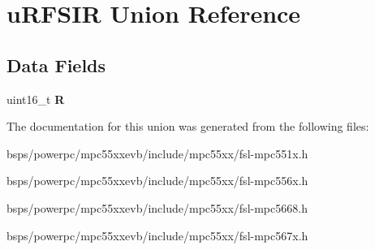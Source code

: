\hypertarget{unionuRFSIR}{}\section{u\+R\+F\+S\+IR Union Reference}
\label{unionuRFSIR}
\subsection*{Data Fields}
\begin{DoxyCompactItemize}
\item 
\mbox{\label{unionuRFSIR_a9af810821165fb55083817e7209de372}} 
uint16\+\_\+t {\bfseries R}
\end{DoxyCompactItemize}


The documentation for this union was generated from the following files\+:\begin{DoxyCompactItemize}
\item 
bsps/powerpc/mpc55xxevb/include/mpc55xx/fsl-\/mpc551x.\+h\item 
bsps/powerpc/mpc55xxevb/include/mpc55xx/fsl-\/mpc556x.\+h\item 
bsps/powerpc/mpc55xxevb/include/mpc55xx/fsl-\/mpc5668.\+h\item 
bsps/powerpc/mpc55xxevb/include/mpc55xx/fsl-\/mpc567x.\+h\end{DoxyCompactItemize}
